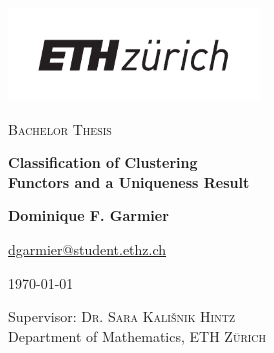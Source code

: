 \begin{titlepage}
\begin{center}
\vspace{1cm}
\includegraphics[width=0.5\textwidth]{assets/logo.pdf}\\
\vspace{1cm}


\textsc{Bachelor Thesis}

\vspace{1cm}

{\huge \textbf{Classification of Clustering \\ Functors and a Uniqueness Result}}

\vspace{1cm}
\textbf{Dominique F. Garmier}
       
\vspace{0.15cm}
       
\href{mailto:dgarmier@student.ethz.ch}{dgarmier@student.ethz.ch}

\vspace{0.25cm}

\today

\vfill
            
\vspace{0.8cm}
     
Supervisor: \textsc{Dr. Sara Kali\v snik Hintz}\\
Department of Mathematics, \textsc{ETH Zürich}\\
       
\end{center}
\end{titlepage}
